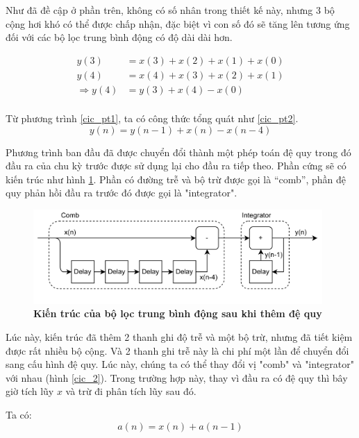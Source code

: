 Như đã đề cập ở phần trên, không có số nhân trong thiết kế này, nhưng 3 bộ cộng hơi khó có thể được chấp nhận, đặc biệt vì con số đó sẽ tăng lên tương ứng đối với các bộ lọc trung bình động có độ dài dài hơn.

\begin{equation}\label{cic_pt1}
  \begin{aligned}
        y(3) &= x(3) + x(2) + x(1) + x(0)\\
        y(4) &=  x(4) + x(3) + x(2) + x(1)\\
        \Rightarrow y(4) &=  y(3) + x(4) -x(0)\\
\end{aligned}  
\end{equation}

Từ phương trình \ref{cic_pt1}, ta có công thức tổng quát như \ref{cic_pt2}.
\begin{equation} \label{cic_pt2}
    y(n) = y(n-1) + x(n) - x(n-4)
\end{equation}

Phương trình ban đầu đã được chuyển đổi thành một phép toán đệ quy trong đó đầu ra của chu kỳ trước được sử dụng lại cho đầu ra tiếp theo. Phần cứng sẽ có kiến trúc như hình \ref{cic_3}. Phần có đường trễ và bộ trừ được gọi là “comb”, phần đệ quy phản hồi đầu ra trước đó được gọi là "integrator".
\begin{figure}[H]
    \centering
    \includegraphics[width=11cm]{Images/Chuong2/cic/cic_3.png}
    \caption[Kiến trúc của bộ lọc trung bình động sau khi thêm đệ quy]{\bfseries \fontsize{12pt}{0pt}\selectfont Kiến trúc của bộ lọc trung bình động sau khi thêm đệ quy}
    \label{cic_3}
\end{figure}

Lúc này, kiến trúc đã thêm 2 thanh ghi độ trễ và một bộ trừ, nhưng đã tiết kiệm được rất nhiều bộ cộng. Và 2 thanh ghi trễ này là chi phí một lần để chuyển đổi sang cấu hình đệ quy. Lúc này, chúng ta có thể thay đổi vị "comb" và "integrator" với nhau (hình \ref{cic_2}). Trong trường hợp này, thay vì đầu ra có đệ quy thì bây giờ tích lũy $x$ và trừ đi phân tích lũy sau đó.

Ta có:
\begin{equation} \label{cic_pt3}
    a(n) = x(n) + a(n-1)
\end{equation}

